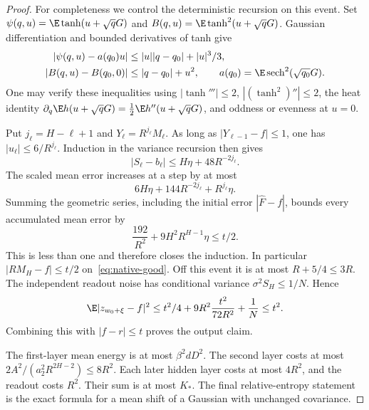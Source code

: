 \begin{proof}
For completeness we control the deterministic recursion on this event. Set
$\psi(q,u)=\E\tanh(u+\sqrt qG)$ and
$B(q,u)=\E\tanh^2(u+\sqrt qG)$.
Gaussian differentiation and bounded derivatives of tanh give
\begin{align*}
 |\psi(q,u)-a(q_0)u|&\le |u||q-q_0|+|u|^3/3,\\
 |B(q,u)-B(q_0,0)|&\le|q-q_0|+u^2,
 \qquad a(q_0)=\E\operatorname{sech}^2(\sqrt{q_0}G).
\end{align*}
One may verify these inequalities using $|\tanh'''|\le2$, $|(\tanh^2)''|\le2$, the heat identity $\partial_q\E h(u+\sqrt qG)=\frac12\E h''(u+\sqrt qG)$, and oddness or evenness at $u=0$.

Put $j_\ell=H-\ell+1$ and $Y_\ell=R^{j_\ell}M_\ell$. As long as $|Y_{\ell-1}-f|\le1$, one has $|u_\ell|\le6/R^{j_\ell}$. Induction in the variance recursion then gives
\[
 |S_\ell-b_\ell|\le H\eta+48R^{-2j_\ell}.
\]
The scaled mean error increases at a step by at most
\[
 6H\eta+144R^{-2j_\ell}+R^{j_\ell}\eta.
\]
Summing the geometric series, including the initial error $|\widehat F-f|$, bounds every accumulated mean error by
\[
 \frac{192}{R^2}+9H^2R^{H-1}\eta\le t/2.
\]
This is less than one and therefore closes the induction. In particular $|RM_H-f|\le t/2$ on~\eqref{eq:native-good}. Off this event it is at most $R+5/4\le3R$. The independent readout noise has conditional variance $\sigma^2S_H\le1/N$. Hence
\[
 \E|z_{w_0+\xi}-f|^2
 \le t^2/4+9R^2\frac{t^2}{72R^2}+\frac1N\le t^2.
\]
Combining this with $|f-r|\le t$ proves the output claim.

The first-layer mean energy is at most $\beta^2dD^2$. The second layer costs at most $2A^2/(a_2^2R^{2H-2})\le8R^2$. Each later hidden layer costs at most $4R^2$, and the readout costs $R^2$. Their sum is at most $K_*$. The final relative-entropy statement is the exact formula for a mean shift of a Gaussian with unchanged covariance.
\end{proof}

